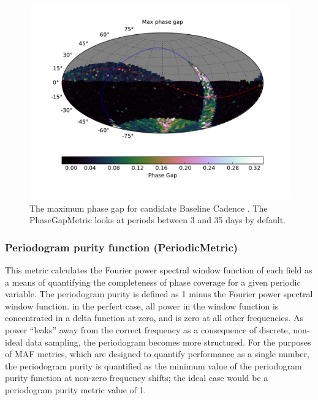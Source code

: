 \begin{figure}[tbh!]
\includegraphics{figs/variables/enigma_1189_Phase_Gap_LargestGap_OPSI_SkyMap.pdf}
\caption{The maximum phase gap for candidate Baseline Cadence .
The PhaseGapMetric looks at periods between 3 and 35 days by default.}
\label{fig:enigmaMaxGap}
\end{figure}

\subsubsection{Periodogram purity function (PeriodicMetric)}

This metric calculates the Fourier power spectral window function of each field
\citep{1987AJ.....93..968R} as a means of quantifying the completeness of phase
coverage for a given periodic variable. The periodogram purity is defined as 1
minus the Fourier power spectral window function. in the perfect case, all
power in the window function is concentrated in a delta function at zero, and
is zero at all other frequencies. As power ``leaks'' away from the correct
frequency as a consequence of discrete, non-ideal data sampling, the
periodogram becomes more structured. For the purposes of MAF metrics, which are
designed to quantify performance as a single number, the periodogram purity is
quantified as the minimum value of the periodogram purity function at non-zero
frequency shifts; the ideal case would be a periodogram purity metric value of
1.

